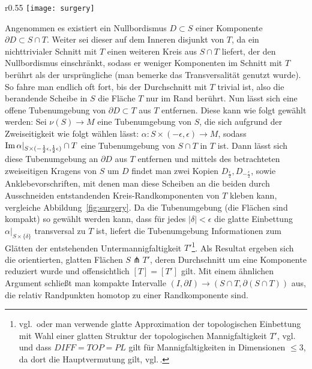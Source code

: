                         \begin{wrapfigure}{r}{0.55\textwidth}
                \centering
                \texttt{[image: surgery]}
                \caption{Ausschneiden einer Umgebung von $S\cap T$ und Ankleben zweier Scheiben, sodass die Homologieklasse erhalten bleibt}
                \label{fig:surgery}
            \end{wrapfigure} 
            Angenommen es existiert ein Nullbordismus $D\subset S$ einer Komponente $\partial D \subset S \cap T$. Weiter sei dieser auf dem Inneren disjunkt von $T$, da ein nichttrivialer Schnitt mit $T$ einen weiteren Kreis aus $S\cap T$ liefert, der den Nullbordismus einschränkt, sodass er weniger Komponenten im Schnitt mit $T$ berührt als der ursprüngliche (man bemerke das Transversalität genutzt wurde). So fahre man endlich oft fort, bis der Durchschnitt mit $T$ trivial ist, also die berandende Scheibe in $S$ die Fläche $T$ nur im Rand berührt.
            Nun lässt sich eine offene Tubenumgebung von $\partial D \subset T$ aus $T$ entfernen.
			Diese kann wie folgt gewählt werden: Sei $\nu(S) \to M$ eine Tubenumgebung von $S$, die sich aufgrund der Zweiseitigkeit wie folgt wählen lässt: $\alpha: S \times (-\epsilon,\epsilon) \to M$, sodass $\operatorname{Im}\alpha|_{S\times (-\frac 12\epsilon,\frac 12 \epsilon)} \cap T$ eine Tubenumgebung von $S\cap T $ in $ T$ ist. Dann lässt sich diese Tubenumgebung an $\partial D$ aus $T$ entfernen und mittels des betrachteten zweiseitigen Kragens von $S$ um $D$ findet man zwei Kopien $D_{\frac \epsilon 2}, D_{-\frac \epsilon 2}$, sowie Anklebevorschriften, mit denen man diese Scheiben an die beiden durch Ausschneiden entstandenden Kreis-Randkomponenten von $T$ kleben kann, vergleiche Abbildung~\ref{fig:surgery}. Da die Tubenumgebung (die Flächen sind kompakt) so gewählt werden kann, dass für jedes $|\delta|<\epsilon$ die glatte Einbettung $\alpha|_{S \times \{\delta\}}$ transversal zu $T$ ist, liefert die Tubenumgebung Informationen zum Glätten der entstehenden Untermannigfaltigkeit $T'$\footnote{vgl.\,\cite{WhiteheadJ.H.C..1961} oder man verwende glatte Approximation der topologischen Einbettung mit Wahl einer glatten Struktur der topologischen Mannigfaltigkeit $T'$, vgl.\,\cite[Chapter 5, Lemma 1.5]{Hirsch.1991} und dass $DIFF=TOP=PL$ gilt für Mannigfaltigkeiten in Dimensionen $\le 3$, da dort die Hauptvermutung gilt, vgl.\,\cite[Chapter 35,36]{Moise.1977}.}. Als Resultat ergeben sich die orientierten, glatten Flächen $S \pitchfork T'$, deren Durchschnitt um eine Komponente reduziert wurde und offensichtlich $[T]=[T']$ gilt. Mit einem ähnlichen Argument schließt man kompakte Intervalle $(I,\partial I) \to (S\cap T, \partial(S\cap T))$ aus, die relativ Randpunkten homotop zu einer Randkomponente sind. 

